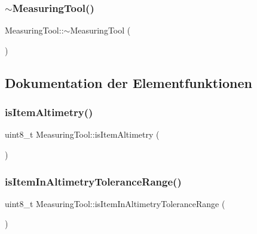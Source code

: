 \hypertarget{class_measuring_tool_a35667285cd41bda48fcc747194c862cd}{}\label{class_measuring_tool_a35667285cd41bda48fcc747194c862cd} 
\subsubsection{\texorpdfstring{$\sim$\+Measuring\+Tool()}{~MeasuringTool()}}
{\footnotesize\ttfamily Measuring\+Tool\+::$\sim$\+Measuring\+Tool (\begin{DoxyParamCaption}{ }\end{DoxyParamCaption})\hspace{0.3cm}{\ttfamily [virtual]}}



\subsection{Dokumentation der Elementfunktionen}
\hypertarget{class_measuring_tool_aebbb332d935cadef3c072ca7102896d3}{}\label{class_measuring_tool_aebbb332d935cadef3c072ca7102896d3} 
\subsubsection{\texorpdfstring{is\+Item\+Altimetry()}{isItemAltimetry()}}
{\footnotesize\ttfamily uint8\+\_\+t Measuring\+Tool\+::is\+Item\+Altimetry (\begin{DoxyParamCaption}{ }\end{DoxyParamCaption})}

\hypertarget{class_measuring_tool_a431263df5654d0dc1587ef23e97c1392}{}\label{class_measuring_tool_a431263df5654d0dc1587ef23e97c1392} 
\subsubsection{\texorpdfstring{is\+Item\+In\+Altimetry\+Tolerance\+Range()}{isItemInAltimetryToleranceRange()}}
{\footnotesize\ttfamily uint8\+\_\+t Measuring\+Tool\+::is\+Item\+In\+Altimetry\+Tolerance\+Range (\begin{DoxyParamCaption}{ }\end{DoxyParamCaption})}

